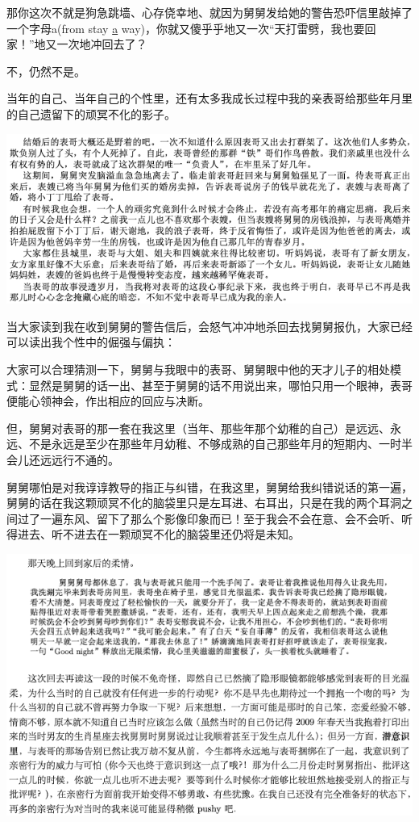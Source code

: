\documentclass[9pt, b5paper]{article}
\begin{document}
那你这次不就是狗急跳墙、心存侥幸地、就因为舅舅发给她的警告恐吓信里敲掉了一个字母a(from stay \uline{a} way)，你就又傻乎乎地又一次“天打雷劈，我也要回家！”地又一次地冲回去了？

不，仍然不是。 

当年的自己、当年自己的个性里，还有太多我成长过程中我的亲表哥给那些年月里的自己遗留下的顽冥不化的影子。

\begin{center}
\includegraphics[width=.9\linewidth]{./pic/p1p88.png}
\end{center}

当大家读到我在收到舅舅的警告信后，会怒气冲冲地杀回去找舅舅报仇，大家已经可以读出我个性中的倔强与偏执：

大家可以合理猜测一下，舅舅与我眼中的表哥、舅舅眼中他的天才儿子的相处模式：显然是舅舅的话一出、甚至于舅舅的话不用说出来，哪怕只用一个眼神，表哥便能心领神会，作出相应的回应与决断。

但，舅舅对表哥的那一套在我这里（当年、那些年那个幼稚的自己）是远远、永远、不是永远是至少在那些年月幼稚、不够成熟的自己那些年月的短期内、一时半会儿还远远行不通的。 

舅舅哪怕是对我谆谆教导的指正与纠错，在我这里，舅舅给我纠错说话的第一遍，舅舅的话在我这颗顽冥不化的脑袋里只是左耳进、右耳出，只是在我的两个耳洞之间过了一遍东风、留下了那么个影像印象而已！至于我会不会在意、会不会听、听得进去、听不进去在一颗顽冥不化的脑袋里还仍将是未知。

\begin{center}
\includegraphics[width=.9\linewidth]{./pic/pfp32.png}
\end{center}
\end{document}
